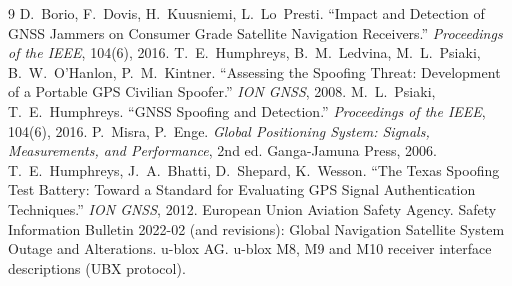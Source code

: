 \documentclass[11pt,a4paper]{article}
\begin{document}
\begin{thebibliography}{9}
 D.~Borio, F.~Dovis, H.~Kuusniemi, L.~Lo~Presti. ``Impact and Detection of GNSS Jammers on
  Consumer Grade Satellite Navigation Receivers.'' \emph{Proceedings of the IEEE}, 104(6), 2016.
 T.~E.~Humphreys, B.~M.~Ledvina, M.~L.~Psiaki, B.~W.~O'Hanlon, P.~M.~Kintner. ``Assessing
  the Spoofing Threat: Development of a Portable GPS Civilian Spoofer.'' \emph{ION GNSS}, 2008.
 M.~L.~Psiaki, T.~E.~Humphreys. ``GNSS Spoofing and Detection.'' \emph{Proceedings of the IEEE},
  104(6), 2016.
 P.~Misra, P.~Enge. \emph{Global Positioning System: Signals, Measurements, and Performance}, 2nd ed.
  Ganga-Jamuna Press, 2006.
 T.~E.~Humphreys, J.~A.~Bhatti, D.~Shepard, K.~Wesson. ``The Texas Spoofing Test Battery: Toward a
  Standard for Evaluating GPS Signal Authentication Techniques.'' \emph{ION GNSS}, 2012.
 European Union Aviation Safety Agency. Safety Information Bulletin 2022-02 (and revisions):
  Global Navigation Satellite System Outage and Alterations.
 u-blox AG. u-blox M8, M9 and M10 receiver interface descriptions (UBX protocol).
\end{thebibliography}
\end{document}
